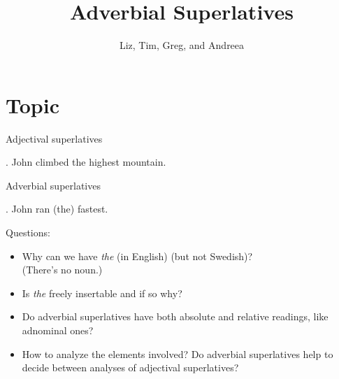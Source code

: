 \documentclass[xcolor=dvipsnames]{beamer}
\title{Adverbial Superlatives}
\author[Comparatives Group]{Liz, Tim, Greg, and Andreea}
\institute{SIASSI Summer Institute 2015}
\begin{document}
\frame{\titlepage}

\section{Topic}

\begin{frame}{Adjectival superlatives}

\ex. John climbed the highest mountain.

\end{frame}

\begin{frame}{Adverbial superlatives}

\ex. John ran (the) fastest.

Questions:
\begin{itemize}
\item Why can we have {\em the} (in English) (but not Swedish)? \\
(There's no noun.)
\item Is {\em the} freely insertable and if so why?
\item Do adverbial superlatives have both absolute and relative
  readings, like adnominal ones?
\item How to analyze the elements involved? Do adverbial superlatives
  help to decide between analyses of adjectival superlatives?
\end{itemize}
\end{frame}






\end{document}
